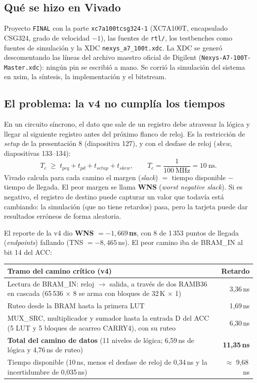 \documentclass[11pt,a4paper]{article}
\begin{document}
\subsection{Qué se hizo en Vivado}
{\sloppy Proyecto \texttt{FINAL} con la parte \texttt{xc7a100tcsg324-1} (XC7A100T, encapsulado CSG324, grado de velocidad $-1$), las fuentes de \texttt{rtl/}, los testbenches como fuentes de simulación y la XDC \texttt{nexys\_a7\_100t.xdc}. La XDC se generó descomentando las líneas del archivo maestro oficial de Digilent (\texttt{Nexys-A7-100T-Master.xdc}): ningún pin se escribió a mano. Se corrió la simulación del sistema en xsim, la síntesis, la implementación y el bitstream.\par}

\subsection{El problema: la v4 no cumplía los tiempos}
En un circuito síncrono, el dato que sale de un registro debe atravesar la lógica y llegar al siguiente registro antes del próximo flanco de reloj. Es la restricción de \emph{setup} de la presentación 8 (diapositiva 127), y con el desfase de reloj (\emph{skew}, diapositivas 133–134):
\[
T_c \;\ge\; t_{pcq} + t_{pd} + t_{setup} + t_{skew}, \qquad T_c = \frac{1}{100\ \text{MHz}} = 10\ \text{ns}.
\]
Vivado calcula para cada camino el margen (\emph{slack}) $=$ tiempo disponible $-$ tiempo de llegada. El peor margen se llama \textbf{WNS} (\emph{worst negative slack}). Si es negativo, el registro de destino puede capturar un valor que todavía está cambiando: la simulación (que no tiene retardos) pasa, pero la tarjeta puede dar resultados erróneos de forma aleatoria.

El reporte de la v4 dio \textbf{WNS $= -1{,}669$\,ns}, con 8 de 1\,353 puntos de llegada (\emph{endpoints}) fallando (TNS $= -8{,}465$\,ns). El peor camino iba de BRAM\_IN al bit 14 del ACC:

\begin{center}
\small
\begin{tabularx}{\linewidth}{>{\raggedright\arraybackslash}X r}
\toprule
\textbf{Tramo del camino crítico (v4)} & \textbf{Retardo} \\
\midrule
Lectura de BRAM\_IN: reloj $\to$ salida, a través de dos RAMB36 en cascada (65\,536 × 8 se arma con bloques de 32\,K × 1) & 3,36\,ns \\
Ruteo desde la BRAM hasta la primera LUT & 1,69\,ns \\
MUX\_SRC, multiplicador y sumador hasta la entrada D del ACC (5 LUT y 5 bloques de acarreo CARRY4), con su ruteo & 6,30\,ns \\
\midrule
\textbf{Total del camino de datos} (11 niveles de lógica; 6,59\,ns de lógica y 4,76\,ns de ruteo) & \textbf{11,35\,ns} \\
Tiempo disponible (10\,ns, menos el desfase de reloj de 0,34\,ns y la incertidumbre de 0,035\,ns) & $\approx$ 9,68\,ns \\
\bottomrule
\end{tabularx}
\end{center}
\end{document}
